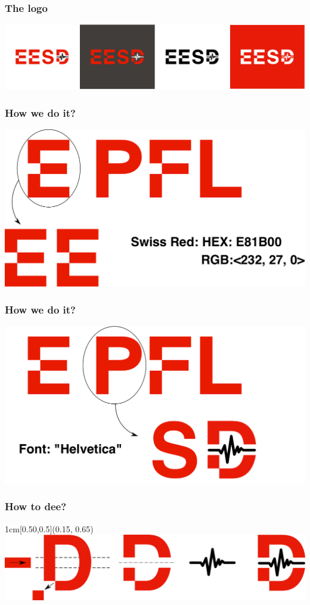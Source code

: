 \documentclass{EESD}
\begin{document}
\begin{frame}
\frametitle{The logo}
\includegraphics[height=0.37\textheight]{EESD_different_bg.pdf}
\end{frame}

\begin{frame}
\frametitle{How we do it?}
\hspace{1.7cm}
\includegraphics[height=0.7\textheight]{EESD_how_1.pdf}
\end{frame}

\begin{frame}
\frametitle{How we do it?}
\hspace{1.7cm}
\includegraphics[height=0.7\textheight]{EESD_how_2.pdf}
\end{frame}

\begin{frame}
\frametitle{How to dee?}
\begin{textblock*}{1cm}[0.50,0.5](0.15\textwidth, 0.65\textheight)
        \includegraphics[height=0.35\textheight]{EESD_how_3.pdf}
\end{textblock*}
\end{frame}
\end{document}
